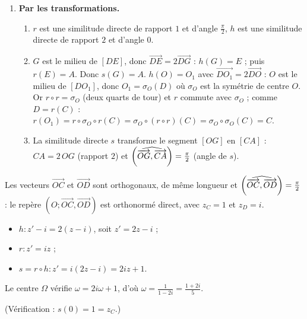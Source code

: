 \begin{description}
\begin{enumerate}
\begin{enumerate}
		\end{enumerate}
		\item \textbf{Par les transformations.}
		\begin{enumerate}
			\item {}
				$r$ est une similitude directe de rapport $1$ et d'angle $\frac{\pi}{2}$, $h$ est une similitude directe de rapport $2$ et d'angle $0$.
				\par\noindent{}
			\item {}
				$G$ est le milieu de $[DE]$, donc $\overrightarrow{DE} = 2\overrightarrow{DG}$ : $h(G) = E$ ; puis $r(E) = A$. Donc $s(G) = A$.
				$h(O) = O_1$ avec $\overrightarrow{DO_1} = 2\overrightarrow{DO}$ : $O$ est le milieu de $[DO_1]$, donc $O_1 = \sigma_O(D)$ où $\sigma_O$ est la symétrie de centre $O$.
				Or $r \circ r = \sigma_O$ (deux quarts de tour) et $r$ commute avec $\sigma_O$ ; comme $D = r(C)$ :
				$r(O_1) = r \circ \sigma_O \circ r (C) = \sigma_O \circ (r \circ r)(C) = \sigma_O \circ \sigma_O (C) = C$.
				\par\noindent{}
			\item {}
				La similitude directe $s$ transforme le segment $[OG]$ en $[CA]$ : $CA = 2\,OG$ (rapport $2$) et
				$\left( \widehat{ \overrightarrow{OG} , \overrightarrow{CA} } \right) = \frac{\pi}{2}$ (angle de $s$).
				\par\noindent{}
		\end{enumerate}
	\end{enumerate}
	\item[Partie C]
	Les vecteurs $\overrightarrow{OC}$ et $\overrightarrow{OD}$ sont orthogonaux, de même longueur et $\left( \widehat{ \overrightarrow{OC} , \overrightarrow{OD} } \right) = \frac{\pi}{2}$ : le repère $(O;\overrightarrow{OC},\overrightarrow{OD})$ est orthonormé direct, avec $z_C = 1$ et $z_D = i$.
	\begin{itemize}
		\item $h : z' - i = 2(z - i)$, soit $z' = 2z - i$ ;
		\item $r : z' = iz$ ;
		\item $s = r \circ h : z' = i(2z - i) = 2iz + 1$.
	\end{itemize}
	Le centre $\Omega$ vérifie $\omega = 2i\omega + 1$, d'où $\omega = \frac{1}{1 - 2i} = \frac{1 + 2i}{5}$.
	\par\noindent{}
	(Vérification : $s(0) = 1 = z_C$.)
\end{description}
